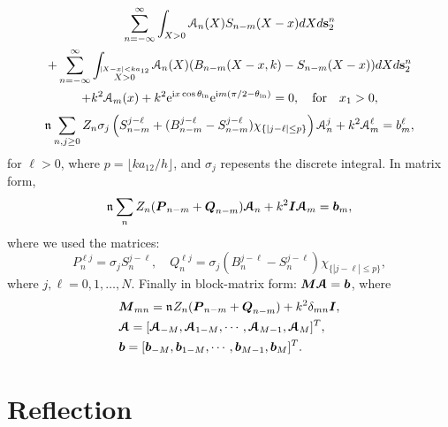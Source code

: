 \documentclass[12pt, a4paper]{article}
\begin{document}
\begin{multline}
  \sum_{n=-\infty}^\infty
  \int_{X>0} \mathcal A_n (X) S_{n-m}(X-x) dX
  d\mathbf s_2^n
  \\
  +  \sum_{n=-\infty}^\infty
    \int_{\stackrel{|X-x| < k a_{12}}{X>0}} \mathcal A_n (X) (B_{n-m}(X- x,k) - S_{n-m}(X-x) )dX
    d\mathbf s_2^n
\\
+  k^2 \mathcal A_m (x)   + k^2  \textrm{e}^{\textrm{i} x \cos \theta_{\mathrm{in}}} \textrm{e}^{\textrm{i} m ( \pi/2 - \theta_{\mathrm{in}} )}
   = 0, \quad \text{for} \quad x_1 >0,
  \label{eqn:ensemAsystem4}
\end{multline}
\begin{equation}
  \mathfrak n_{} \sum_{n,j \geq 0}  Z_n  \sigma_j  \left ( S_{n-m}^{j-\ell}
  +  (B_{n-m}^{j-\ell} - S_{n-m}^{j -\ell} ) \chi_{\{|j-\ell|\leq p\}} \right) \mathcal A_n^j+  k^2  \mathcal A_m^\ell  =  b_m^\ell,
  \label{eqn:ensemAsystemN}
\end{equation}
for $\ell >0$, where $p = \lfloor k a_{12}/h \rfloor$, and $\sigma_j$ repesents the discrete integral. In matrix form,
\begin{equation}
  \mathfrak n_{} \sum_{n}  Z_n ( \boldsymbol{P}_{n-m} + \boldsymbol{Q}_{n-m}) \boldsymbol{\mathcal A}_n
+  k^2 \boldsymbol{I} \boldsymbol{\mathcal A}_m  =  \boldsymbol{b}_m,
  \label{eqn:ensemAsystemN2}
\end{equation}
where we used the matrices:
\begin{equation}
  P_{n}^{\ell j} =  \sigma_j S_{n}^{j-\ell} , \quad Q_{n}^{\ell j} = \sigma_j (B_{n}^{j-\ell} - S_{n}^{j -\ell} ) \chi_{\{|j-\ell| \leq p\}},
\end{equation}
where $j,\ell = 0,1, \ldots, N$. Finally in block-matrix form: $\boldsymbol{M} \boldsymbol{\mathcal A}  =  \boldsymbol{b}$, where
\begin{align}
&\boldsymbol{M}_{mn} = \mathfrak n_{} Z_n ( \boldsymbol{P}_{n-m} + \boldsymbol{Q}_{n-m})+  k^2 \delta_{mn} \boldsymbol{I},
\\
& \boldsymbol{\mathcal A} = [ \boldsymbol{\mathcal A}_{-M}, \boldsymbol{\mathcal A}_{1-M}, \cdots, \boldsymbol{\mathcal A}_{M-1}, \boldsymbol{\mathcal A}_{M}]^T,
\\
& \boldsymbol{b} = [ \boldsymbol{b}_{-M}, \boldsymbol{b}_{1-M}, \cdots, \boldsymbol{b}_{M-1}, \boldsymbol{b}_{M}]^T.
  \label{eqn:ensemAsystemB}
\end{align}

\section{Reflection}
\end{document}
